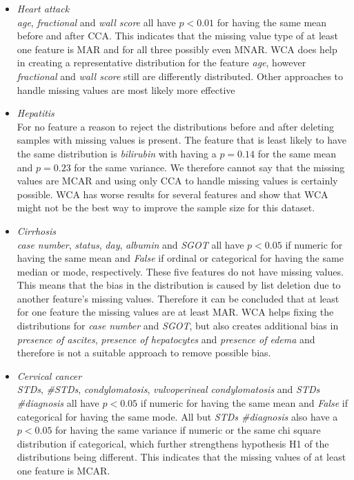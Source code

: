 \documentclass[10pt,a4paper]{report}
\begin{document}
	\begin{itemize}
		\item \textit{Heart attack} \\ 
		\textit{age}, \textit{fractional} and \textit{wall score} all have $p < 0.01$ for having the same mean before and after CCA. This indicates that the missing value type of at least one feature is MAR and for all three possibly even MNAR. WCA does help in creating a representative distribution for the feature \textit{age}, however \textit{fractional} and \textit{wall score} still are differently distributed. Other approaches to handle missing values are most likely more effective
		\item \textit{Hepatitis} \\ 
		For no feature a reason to reject the distributions before and after deleting samples with missing values is present. The feature that is least likely to have the same distribution is \textit{bilirubin} with having a $p = 0.14$ for the same mean and $p = 0.23$ for the same variance. We therefore cannot say that the missing values are MCAR and using only CCA to handle missing values is certainly possible. WCA has worse results for several features and show that WCA might not be the best way to improve the sample size for this dataset.
		\item \textit{Cirrhosis} \\ 
		\textit{case number}, \textit{status}, \textit{day}, \textit{albumin} and \textit{SGOT} all have $p < 0.05$ if numeric for having the same mean and \textit{False} if ordinal or categorical for having the same median or mode, respectively. These five features do not have missing values. This means that the bias in the distribution is caused by list deletion due to another feature's missing values. Therefore it can be concluded that at least for one feature the missing values are at least MAR. WCA helps fixing the distributions for \textit{case number} and \textit{SGOT}, but also creates additional bias in \textit{presence of ascites}, \textit{presence of hepatocytes} and \textit{presence of edema} and therefore is not a suitable approach to remove possible bias. 
		\item \textit{Cervical cancer} \\ 
		\textit{STDs}, \textit{\#STDs}, \textit{condylomatosis}, \textit{vulvoperineal condylomatosis} and \textit{STDs \#diagnosis} all have $p < 0.05$ if numeric for having the same mean and \textit{False} if categorical for having the same mode. All but \textit{STDs \#diagnosis} also have a $p < 0.05$ for having the same variance if numeric or the same chi square distribution if categorical, which further strengthens hypothesis H1 of the distributions being different. This indicates that the missing values of at least one feature is MCAR.
	\end{itemize}
	
\end{document}
